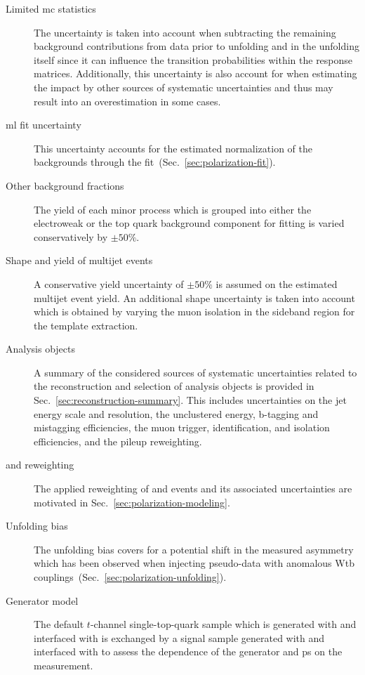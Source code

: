 \begin{description}
\item[Limited \gls{mc} statistics] The uncertainty is taken into account when subtracting the remaining background contributions from data prior to unfolding and in the unfolding itself since it can influence the transition probabilities within the response matrices. Additionally, this uncertainty is also account for when estimating the impact by other sources of systematic uncertainties and thus may result into an overestimation in some cases.

\item[\Gls{ml} fit uncertainty] This uncertainty accounts for the estimated normalization of the backgrounds through the fit~(Sec.~\ref{sec:polarization-fit}).

\item[Other background fractions] The yield of each minor process which is grouped into either the electroweak or the top quark background component for fitting is varied conservatively by $\pm50\%$.

\item[Shape and yield of multijet events] A conservative yield uncertainty of $\pm50\%$ is assumed on the estimated multijet event yield. An additional shape uncertainty is taken into account which is obtained by varying the muon isolation in the sideband region for the template extraction.

\item[Analysis objects] A summary of the considered sources of systematic uncertainties related to the reconstruction and selection of analysis objects is provided in Sec.~\ref{sec:reconstruction-summary}. This includes uncertainties on the jet energy scale and resolution, the unclustered energy, b-tagging and mistagging efficiencies, the muon trigger, identification, and isolation efficiencies, and the pileup reweighting.

\item[\wjets and \ttbar reweighting] The applied reweighting of \ttbar and \wjets events and its associated uncertainties are motivated in Sec.~\ref{sec:polarization-modeling}. 

\item[Unfolding bias] The unfolding bias covers for a potential shift in the measured asymmetry which has been observed when injecting pseudo-data with anomalous Wtb couplings~(Sec.~\ref{sec:polarization-unfolding}).

\item[Generator model] The default $t$-channel single-top-quark sample which is generated with \POWHEG and interfaced with  is exchanged by a signal sample generated with \AMC and interfaced with  to assess the dependence of the generator and \gls{ps} on the measurement.


\end{description}
